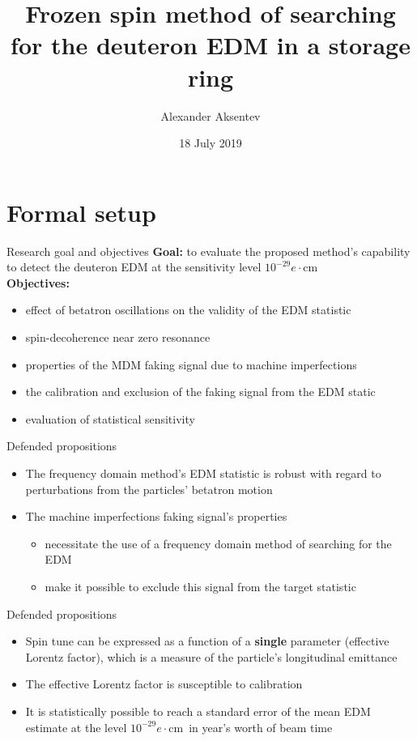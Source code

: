 \documentclass[14pt]{beamer}
\title[Thesis presentation]{Frozen spin method of searching for the deuteron EDM in a storage ring}
\author[A. Aksentev]{Alexander Aksentev \inst{1,2}}
\institute[NRNU MEPhI]{
	\inst{1} Forschungszentrum J\"ulich \and%
	\inst{2} NRNU ``MEPhI''
}
\date{18 July 2019}
\renewcommand{\ecm}{$e\cdot$cm}
\begin{document}
	\maketitle
	
	
\section{Formal setup}
\begin{frame}{Research goal and objectives}
	\textbf{Goal:} to evaluate the proposed method's capability to detect the deuteron EDM at the sensitivity level $10^{-29}$\ecm \\
	\pause
	\textbf{Objectives:}
	\begin{itemize}
		\item effect of betatron oscillations on the validity of the EDM statistic
		\item spin-decoherence near zero resonance
		\item properties of the MDM faking signal due to machine imperfections
		\item the calibration and exclusion of the faking signal from the EDM static
		\item evaluation of statistical sensitivity
	\end{itemize}
\end{frame}

\begin{frame}{Defended propositions}
	\begin{itemize}[<+->]
		\item The frequency domain method's EDM statistic is robust with regard to perturbations from the particles' betatron motion
		\item The machine imperfections faking signal's properties
		\begin{itemize}
			\item necessitate the use of a frequency domain method of searching for the EDM
			\item make it possible to exclude this signal from the target statistic
		\end{itemize}
	\end{itemize}
\end{frame}
\begin{frame}{Defended propositions}
	\begin{itemize}[<+->]
		\item Spin tune can be expressed as a function of a \textbf{single} parameter (effective Lorentz factor), which is a measure of the particle's longitudinal emittance
		\item The effective Lorentz factor is susceptible to calibration
		\item It is statistically possible to reach a standard error of the mean EDM estimate at the level $10^{-29}$\ecm~in year's worth of beam time
	\end{itemize}
\end{frame}
\end{document}

